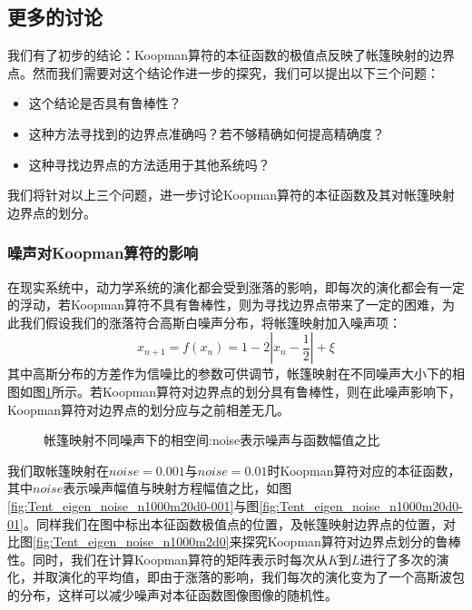 \subsection{更多的讨论}
我们有了初步的结论：Koopman算符的本征函数的极值点反映了帐篷映射的边界点。然而我们需要对这个结论作进一步的探究，我们可以提出以下三个问题：
\begin{itemize}
\item 这个结论是否具有鲁棒性？
\item 这种方法寻找到的边界点准确吗？若不够精确如何提高精确度？
\item 这种寻找边界点的方法适用于其他系统吗？
\end{itemize}
我们将针对以上三个问题，进一步讨论Koopman算符的本征函数及其对帐篷映射边界点的划分。

\subsubsection{噪声对Koopman算符的影响}
在现实系统中，动力学系统的演化都会受到涨落的影响\cite{heninger2015neighborhoods}，即每次的演化都会有一定的浮动，若Koopman算符不具有鲁棒性，则为寻找边界点带来了一定的困难，为此我们假设我们的涨落符合高斯白噪声分布，将帐篷映射加入噪声项：
\begin{equation}
  x_{n+1}=f(x_n)=1-2|x_n-\frac{1}{2}|+\xi
\end{equation}
其中高斯分布的方差作为信噪比的参数可供调节，帐篷映射在不同噪声大小下的相图如图\ref{fig:Tent_noise_phase_d0}所示。若Koopman算符对边界点的划分具有鲁棒性，则在此噪声影响下，Koopman算符对边界点的划分应与之前相差无几。

\begin{figure}[!]
  \centering
  \caption[帐篷映射不同噪声下的相空间]{帐篷映射不同噪声下的相空间:noise表示噪声与函数幅值之比}
  \label{fig:Tent_noise_phase_d0}
\end{figure}

我们取帐篷映射在$noise=0.001$与$noise=0.01$时Koopman算符对应的本征函数，其中$noise$表示噪声幅值与映射方程幅值之比，如图\ref{fig:Tent_eigen_noise_n1000m20d0-001}与图\ref{fig:Tent_eigen_noise_n1000m20d0-01}。同样我们在图中标出本征函数极值点的位置，及帐篷映射边界点的位置，对比图\ref{fig:Tent_eigen_noise_n1000m2d0}来探究Koopman算符对边界点划分的鲁棒性。同时，我们在计算Koopman算符的矩阵表示时每次从$K$到$L$进行了多次的演化，并取演化的平均值，即由于涨落的影响，我们每次的演化变为了一个高斯波包的分布，这样可以减少噪声对本征函数图像图像的随机性。

